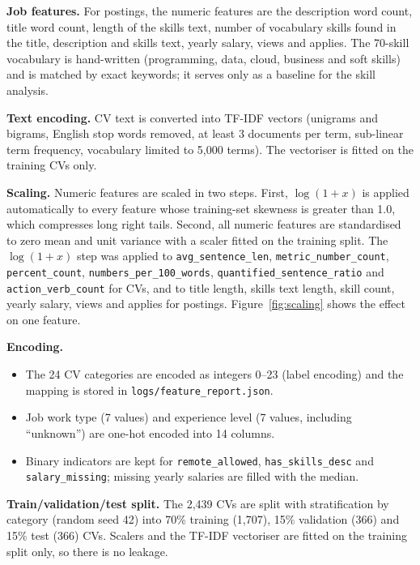 \documentclass[11pt,a4paper]{article}
\begin{document}
\textbf{Job features.} For postings, the numeric features are the
description word count, title word count, length of the skills text,
number of vocabulary skills found in the title, description and skills
text, yearly salary, views and applies. The 70-skill vocabulary is
hand-written (programming, data, cloud, business and soft skills) and is
matched by exact keywords; it serves only as a baseline for the skill
analysis.

\textbf{Text encoding.} CV text is converted into TF-IDF vectors
(unigrams and bigrams, English stop words removed, at least 3 documents
per term, sub-linear term frequency, vocabulary limited to 5{,}000
terms). The vectoriser is fitted on the training CVs only.

\textbf{Scaling.} Numeric features are scaled in two steps. First,
$\log(1+x)$ is applied automatically to every feature whose
training-set skewness is greater than 1.0, which compresses long right
tails. Second, all numeric features are standardised to zero mean and
unit variance with a scaler fitted on the training split. The $\log(1+x)$
step was applied to \texttt{avg\_sentence\_len},
\texttt{metric\_number\_count}, \texttt{percent\_count},
\texttt{numbers\_per\_100\_words}, \texttt{quantified\_sentence\_ratio}
and \texttt{action\_verb\_count} for CVs, and to title length, skills
text length, skill count, yearly salary, views and applies for postings.
Figure~\ref{fig:scaling} shows the effect on one feature.

\textbf{Encoding.}
\begin{itemize}
  \item The 24 CV categories are encoded as integers 0--23
  (label encoding) and the mapping is stored in
  \texttt{logs/feature\_report.json}.
  \item Job work type (7 values) and experience level (7 values,
  including ``unknown'') are one-hot encoded into 14 columns.
  \item Binary indicators are kept for \texttt{remote\_allowed},
  \texttt{has\_skills\_desc} and \texttt{salary\_missing}; missing
  yearly salaries are filled with the median.
\end{itemize}

\textbf{Train/validation/test split.} The 2{,}439 CVs are split with
stratification by category (random seed 42) into 70\% training (1{,}707),
15\% validation (366) and 15\% test (366) CVs. Scalers and the TF-IDF
vectoriser are fitted on the training split only, so there is no leakage.
\end{document}
